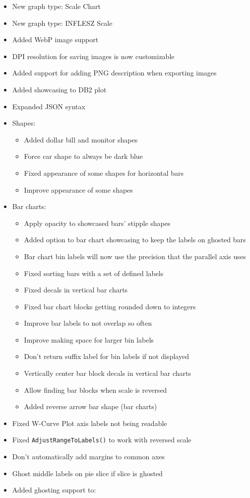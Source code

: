 \documentclass[
]{scrartcl}
\providecommand{\tightlist}{%
  \setlength{\itemsep}{0pt}\setlength{\parskip}{0pt}}
\begin{document}
\begin{itemize}
\tightlist
\item
  New graph type: Scale Chart
\item
  New graph type: INFLESZ Scale
\item
  Added WebP image support
\item
  DPI resolution for saving images is now customizable
\item
  Added support for adding PNG description when exporting images
\item
  Added showcasing to DB2 plot
\item
  Expanded JSON syntax
\item
  Shapes:

  \begin{itemize}
  \tightlist
  \item
    Added dollar bill and monitor shapes
  \item
    Force car shape to always be dark blue
  \item
    Fixed appearance of some shapes for horizontal bars
  \item
    Improve appearance of some shapes
  \end{itemize}
\item
  Bar charts:

  \begin{itemize}
  \tightlist
  \item
    Apply opacity to showcased bars' stipple shapes
  \item
    Added option to bar chart showcasing to keep the labels on ghosted
    bars
  \item
    Bar chart bin labels will now use the precision that the parallel
    axis uses
  \item
    Fixed sorting bars with a set of defined labels
  \item
    Fixed decals in vertical bar charts
  \item
    Fixed bar chart blocks getting rounded down to integers
  \item
    Improve bar labels to not overlap so often
  \item
    Improve making space for larger bin labels
  \item
    Don't return suffix label for bin labels if not displayed
  \item
    Vertically center bar block decals in vertical bar charts
  \item
    Allow finding bar blocks when scale is reversed
  \item
    Added reverse arrow bar shape (bar charts)
  \end{itemize}
\item
  Fixed W-Curve Plot axis labels not being readable
\item
  Fixed \texttt{AdjustRangeToLabels()} to work with reversed scale
\item
  Don't automatically add margins to common axes
\item
  Ghost middle labels on pie slice if slice is ghosted
\item
  Added ghosting support to:


\end{itemize}
\end{document}
